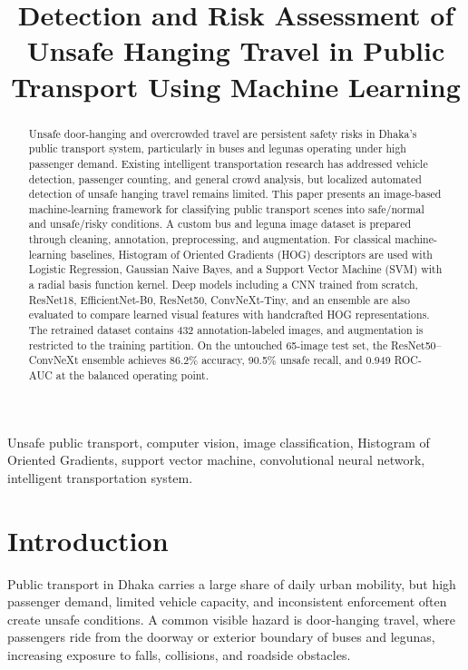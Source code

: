 \documentclass[conference]{IEEEtran}
\title{Detection and Risk Assessment of Unsafe Hanging Travel in Public Transport Using Machine Learning}
\author{\IEEEauthorblockN{Tazkia Malik, Sadek Hossain Asif, Tanzila Khan, Taif Ahmed Turjo, Amio Rashid, Mahmud Hasan Walid}
\IEEEauthorblockA{Department of Computer Science and Engineering\\
University of Dhaka\\
Dhaka, Bangladesh}}
\begin{document}
\maketitle

\begin{abstract}
Unsafe door-hanging and overcrowded travel are persistent safety risks in Dhaka's public transport system, particularly in buses and legunas operating under high passenger demand. Existing intelligent transportation research has addressed vehicle detection, passenger counting, and general crowd analysis, but localized automated detection of unsafe hanging travel remains limited. This paper presents an image-based machine-learning framework for classifying public transport scenes into safe/normal and unsafe/risky conditions. A custom bus and leguna image dataset is prepared through cleaning, annotation, preprocessing, and augmentation. For classical machine-learning baselines, Histogram of Oriented Gradients (HOG) descriptors are used with Logistic Regression, Gaussian Naive Bayes, and a Support Vector Machine (SVM) with a radial basis function kernel. Deep models including a CNN trained from scratch, ResNet18, EfficientNet-B0, ResNet50, ConvNeXt-Tiny, and an ensemble are also evaluated to compare learned visual features with handcrafted HOG representations. The retrained dataset contains 432 annotation-labeled images, and augmentation is restricted to the training partition. On the untouched 65-image test set, the ResNet50--ConvNeXt ensemble achieves 86.2\% accuracy, 90.5\% unsafe recall, and 0.949 ROC-AUC at the balanced operating point.
\end{abstract}

\begin{IEEEkeywords}
Unsafe public transport, computer vision, image classification, Histogram of Oriented Gradients, support vector machine, convolutional neural network, intelligent transportation system.
\end{IEEEkeywords}

\section{Introduction}
Public transport in Dhaka carries a large share of daily urban mobility, but high passenger demand, limited vehicle capacity, and inconsistent enforcement often create unsafe conditions. A common visible hazard is door-hanging travel, where passengers ride from the doorway or exterior boundary of buses and legunas, increasing exposure to falls, collisions, and roadside obstacles.
\end{document}
